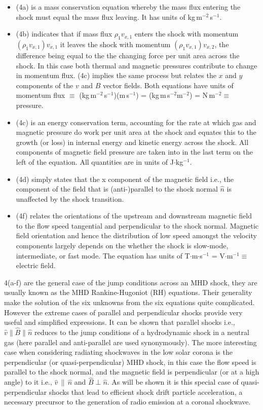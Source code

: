 \begin{itemize}
\item (4a) is a mass conservation equation whereby the mass flux entering the shock must equal the mass flux leaving. It has units of kg\,m$^{-2}$\,s$^{-1}$.
\item (4b) indicates that if mass flux $\rho_{1} v_{x,1}$ enters the shock with momentum $(\rho_{1} v_{x,1})v_{x,1}$ it leaves the shock with momentum $(\rho_{1} v_{x,1})v_{x,2}$, the difference being equal to the the changing force per unit area across the shock. In this case both thermal and magnetic pressures contribute to change in momentum flux. (4c) implies the same process but relates the $x$ and $y$ components of the $v$ and $B$ vector fields. Both equations have units of momentum flux $\equiv$ (kg\,m$^{-2}$\,s$^{-1}$)(m\,s$^{-1}$) = (kg\,m\,s$^{-2}$m$^{-2}$) = N\,m$^{-2}\equiv$ pressure.
\item (4c) is an energy conservation term, accounting for the rate at which gas and magnetic pressure do work per unit area at the shock and equates this to the growth (or loss) in internal energy and kinetic energy across the shock. All components of magnetic field pressure are taken into in the last term on the left of the equation. All quantities are in units of J$\cdot$kg$^{-1}$.
\item (4d) simply states that the x component of the magnetic field i.e., the component of the field that is (anti-)parallel to the shock normal $\hat{n}$ is unaffected by the shock transition. 
\item (4f) relates the orientations of the upstream and downstream magnetic field to the flow speed tangential and perpendicular to the shock normal. Magnetic field orientation and hence the distribution of low speed amongst the velocity components largely depends on the whether the shock is slow-mode, intermediate, or fast mode. The equation has units of T$\cdot$m$\cdot$s$^{-1}$ = V$\cdot$m$^{-1}\equiv$ electric field.
\end{itemize}

4(a-f) are the general case of the jump conditions across an MHD shock, they are usually known as the MHD Rankine-Hugoniot (RH) equations. Their generality make the solution of the six unknowns from the six equations quite complicated. However the extreme cases of parallel and perpendicular shocks provide very useful and simplified expressions. It can be shown that parallel shocks i.e., $\hat{v}\parallel\hat{B}\parallel\hat{n}$ reduces to the jump conditions of a hydrodynamic shock in a neutral gas (here parallel and anti-parallel are used synonymously). The more interesting case when considering radiating shockwaves in the low solar corona is the perpendicular (or quasi-perpendicular) MHD shock, in this case the flow speed is parallel to the shock normal, and the magnetic field is perpendicular (or at a high angle) to it i.e., $\hat{v}\,\|\,\hat{n}$ and $\hat{B}\perp\hat{n}$. As will be shown it is this special case of quasi-perpendicular shocks that lead to efficient shock drift particle acceleration, a necessary precursor to the generation of radio emission at a coronal shockwave. 

